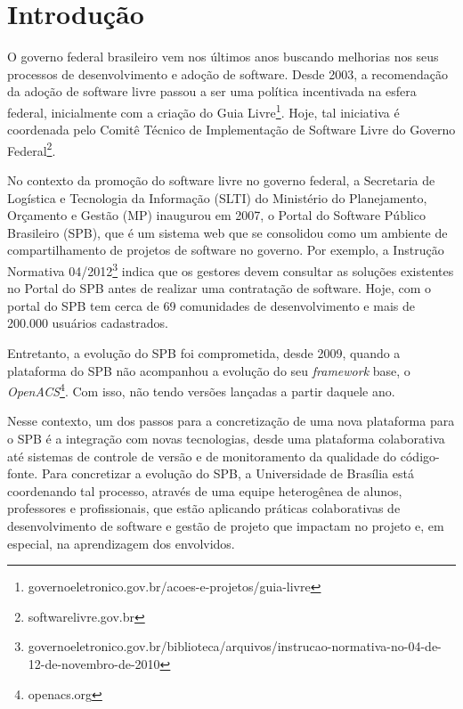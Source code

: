 \section{Introdução}
\label{sec:introducao}

O governo federal brasileiro vem nos últimos anos buscando melhorias nos
seus processos de desenvolvimento e adoção de software.
%
Desde 2003, a recomendação da adoção de software livre passou a ser uma política
incentivada na esfera federal, inicialmente com a criação do
Guia Livre\footnote{governoeletronico.gov.br/acoes-e-projetos/guia-livre}.
%
Hoje, tal iniciativa é coordenada pelo Comitê Técnico de Implementação de
Software Livre do Governo Federal\footnote{softwarelivre.gov.br}.


No contexto da promoção do software livre no governo federal, a
Secretaria de Logística e Tecnologia da Informação (SLTI) do Ministério do
Planejamento, Orçamento e Gestão (MP) inaugurou em 2007, o Portal do Software
Público Brasileiro (SPB), que é um sistema web que se consolidou como
um ambiente de compartilhamento de projetos de software no governo.
%
Por exemplo, a Instrução Normativa
04/2012\footnote{governoeletronico.gov.br/biblioteca/arquivos/instrucao-normativa-no-04-de-12-de-novembro-de-2010}
indica que os gestores devem consultar as soluções existentes no Portal do SPB
antes de realizar uma contratação de software.
%
Hoje, com o portal do SPB tem cerca de 69 comunidades de
desenvolvimento e mais de 200.000 usuários cadastrados.

Entretanto, a evolução do SPB foi comprometida, desde 2009, quando a plataforma
do SPB não acompanhou a evolução do seu \textit{framework} base,
o \emph{OpenACS}\footnote{openacs.org}.
%
Com isso, não tendo versões lançadas a partir daquele ano.

Nesse contexto, um dos passos para a concretização de uma nova plataforma para o
SPB é a integração com novas tecnologias, desde uma plataforma colaborativa até sistemas
de controle de versão e de monitoramento da qualidade do código-fonte.
%
Para concretizar a evolução do SPB, a Universidade de Brasília está coordenando
tal processo, através de uma equipe heterogênea de alunos, professores e
profissionais, que estão aplicando práticas colaborativas de desenvolvimento
de software e gestão de projeto que impactam no projeto e, em especial,
na aprendizagem dos envolvidos.




